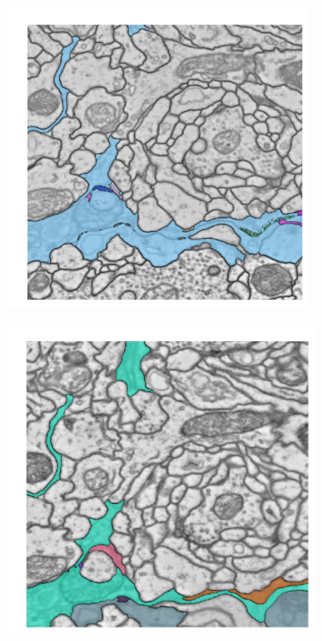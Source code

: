 \begin{figure}
\begin{subfigure}[t]{0.46 \linewidth}
        \includegraphics[width=0.98\textwidth]{figs/comparison/sum_T.pdf}
    \end{subfigure}\hspace{0.5cm}%

    \begin{subfigure}[t]{0.92 \linewidth}
        \centering
        \includegraphics[width=1.\textwidth]{figs/comparison/MWS.pdf}
    \end{subfigure}\hspace{0.5cm}


\end{figure}
